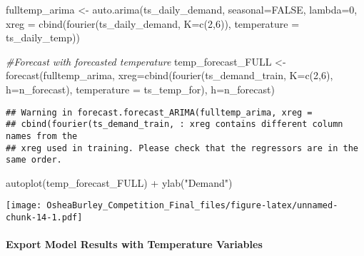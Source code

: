 \documentclass[
]{article}
\newenvironment{Shaded}{\begin{snugshade}}{\end{snugshade}}
\newcommand{\AttributeTok}[1]{\textcolor[rgb]{0.77,0.63,0.00}{#1}}
\newcommand{\CommentTok}[1]{\textcolor[rgb]{0.56,0.35,0.01}{\textit{#1}}}
\newcommand{\ConstantTok}[1]{\textcolor[rgb]{0.00,0.00,0.00}{#1}}
\newcommand{\DecValTok}[1]{\textcolor[rgb]{0.00,0.00,0.81}{#1}}
\newcommand{\FunctionTok}[1]{\textcolor[rgb]{0.00,0.00,0.00}{#1}}
\newcommand{\NormalTok}[1]{#1}
\newcommand{\OtherTok}[1]{\textcolor[rgb]{0.56,0.35,0.01}{#1}}
\newcommand{\SpecialCharTok}[1]{\textcolor[rgb]{0.00,0.00,0.00}{#1}}
\newcommand{\StringTok}[1]{\textcolor[rgb]{0.31,0.60,0.02}{#1}}
\begin{document}
\begin{Shaded}
\begin{Highlighting}[]
\NormalTok{fulltemp\_arima }\OtherTok{\textless{}{-}} \FunctionTok{auto.arima}\NormalTok{(ts\_daily\_demand, }
                             \AttributeTok{seasonal=}\ConstantTok{FALSE}\NormalTok{, }
                             \AttributeTok{lambda=}\DecValTok{0}\NormalTok{,}
         \AttributeTok{xreg =} \FunctionTok{cbind}\NormalTok{(}\FunctionTok{fourier}\NormalTok{(ts\_daily\_demand, }
                                          \AttributeTok{K=}\FunctionTok{c}\NormalTok{(}\DecValTok{2}\NormalTok{,}\DecValTok{6}\NormalTok{)),}
               \AttributeTok{temperature =}\NormalTok{ ts\_daily\_temp))}

\CommentTok{\#Forecast with \textquotesingle{}forecasted\textquotesingle{} temperature}
\NormalTok{temp\_forecast\_FULL }\OtherTok{\textless{}{-}} \FunctionTok{forecast}\NormalTok{(fulltemp\_arima,}
                           \AttributeTok{xreg=}\FunctionTok{cbind}\NormalTok{(}\FunctionTok{fourier}\NormalTok{(ts\_demand\_train, }
                                          \AttributeTok{K=}\FunctionTok{c}\NormalTok{(}\DecValTok{2}\NormalTok{,}\DecValTok{6}\NormalTok{),}
                                          \AttributeTok{h=}\NormalTok{n\_forecast),}
                                \AttributeTok{temperature =}\NormalTok{ ts\_temp\_for),}
                           \AttributeTok{h=}\NormalTok{n\_forecast) }
\end{Highlighting}
\end{Shaded}

\begin{verbatim}
## Warning in forecast.forecast_ARIMA(fulltemp_arima, xreg =
## cbind(fourier(ts_demand_train, : xreg contains different column names from the
## xreg used in training. Please check that the regressors are in the same order.
\end{verbatim}

\begin{Shaded}
\begin{Highlighting}[]
\FunctionTok{autoplot}\NormalTok{(temp\_forecast\_FULL) }\SpecialCharTok{+} \FunctionTok{ylab}\NormalTok{(}\StringTok{"Demand"}\NormalTok{)}
\end{Highlighting}
\end{Shaded}

\texttt{[image: OsheaBurley\_Competition\_Final\_files/figure-latex/unnamed-chunk-14-1.pdf]}

\hypertarget{export-model-results-with-temperature-variables}{%
\paragraph{Export Model Results with Temperature
Variables}\label{export-model-results-with-temperature-variables}}
\end{document}
